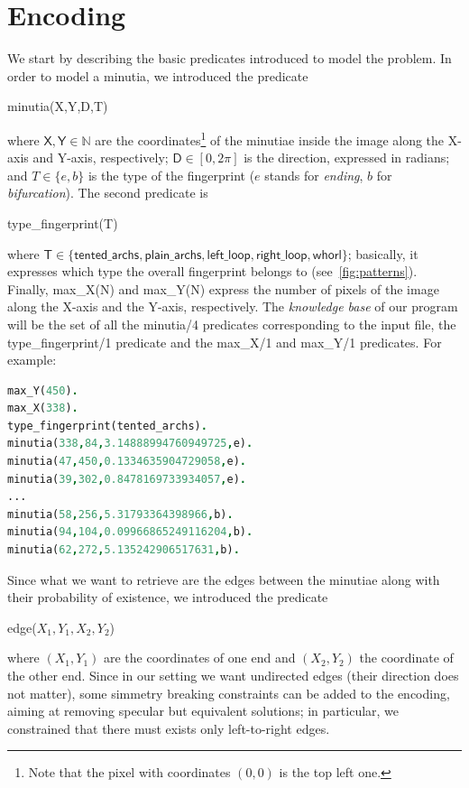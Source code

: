 \documentclass[8pt]{article}
\begin{document}
\section{Encoding}
\label{sec:encoding}
We start by describing the basic predicates introduced to model
the problem. In order to model a minutia, we introduced the predicate
  \begin{center}
    \textsf{minutia(X,Y,D,T)}
  \end{center}
where $\textsf{X},\textsf{Y} \in \mathbb{N}$ are the coordinates\footnote{Note 
that the pixel with coordinates $(0,0)$ is the top left one.}
of the minutiae inside the image along the X-axis and Y-axis, respectively;
$\textsf{D} \in [0,2\pi]$ is the direction, expressed in radians; 
and $T \in \{e,b\}$ is the type of the fingerprint ($e$ stands for
\emph{ending}, $b$ for \emph{bifurcation}).
The second predicate is
  \begin{center}
    \textsf{type\_fingerprint(T)}
  \end{center}
where $\textsf{T}\in\{
  \textsf{tented\_archs},
  \textsf{plain\_archs},
  \textsf{left\_loop},
  \textsf{right\_loop},
  \textsf{whorl}
\}$; 
basically, it expresses which type the overall fingerprint belongs to
(see~\cref{fig:patterns}).
Finally, \textsf{max\_X(N)} and \textsf{max\_Y(N)} express the number
of pixels of the image along the X-axis and the Y-axis, respectively.
The \emph{knowledge base} of our program will be the set of all the 
\textsf{minutia/4} predicates corresponding to the input file,
the \textsf{type\_fingerprint/1} predicate and the \textsf{max\_X/1}
and \textsf{max\_Y/1} predicates. For example:
  \begin{center}
  \begin{lstlisting}[language=Prolog,frame = single,basicstyle=\footnotesize\ttfamily]
max_Y(450).
max_X(338).
type_fingerprint(tented_archs).
minutia(338,84,3.14888994760949725,e).
minutia(47,450,0.1334635904729058,e).
minutia(39,302,0.8478169733934057,e).
...
minutia(58,256,5.31793364398966,b).
minutia(94,104,0.09966865249116204,b).
minutia(62,272,5.135242906517631,b).
  \end{lstlisting}
  \end{center}
Since what we want to retrieve are the edges between the minutiae along
with their probability of existence, we introduced the predicate
  \begin{center}
    \textsf{edge($X_1,Y_1,X_2,Y_2$)}
  \end{center}
where $(X_1,Y_1)$ are the coordinates of one end and $(X_2,Y_2)$
the coordinate of the other end.
Since in our setting we want undirected edges (their direction does not
matter), some simmetry breaking constraints can be added to the 
encoding, aiming at removing specular but equivalent solutions; in
particular, we constrained that there must exists only left-to-right
edges.
\end{document}
